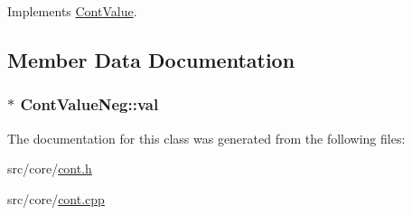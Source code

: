 Implements \hyperlink{a00086_ae3ce98084899bf1a873a1ec6bf15116e}{Cont\-Value}.



\subsection{Member Data Documentation}
\hypertarget{a00092_a94ee4201663a2287b084ab89b8d642f5}{
\subsubsection[{val}]{$\ast$ Cont\-Value\-Neg\-::val\hspace{0.3cm}{\ttfamily [private]}}}\label{a00092_a94ee4201663a2287b084ab89b8d642f5}


The documentation for this class was generated from the following files\-:\begin{DoxyCompactItemize}
\item 
src/core/\hyperlink{a00218}{cont.\-h}\item 
src/core/\hyperlink{a00217}{cont.\-cpp}\end{DoxyCompactItemize}
